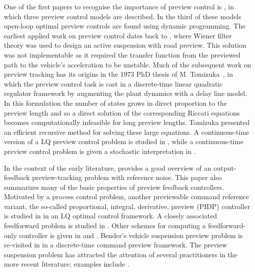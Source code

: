 \documentclass[a4paper,12pt]{article}
\theoremstyle{remark}
\begin{document}
One of the first papers to recognise the importance of preview control is \cite{Sheridan}, in which three preview control models are described. In the third of these models open-loop optimal preview controls are found using dynamic programming. The earliest applied work on preview control dates back to \cite{Bender_1968_PrevSusp}, where Wiener filter theory was used to design an active suspension with road preview. This solution was not implementable as it required the transfer function from the previewed path to the vehicle's acceleration to be unstable. Much of the subsequent work on preview tracking has its origins in the 1973 PhD thesis of M. Tomizuka~\cite{Tomi_1973_Thesis}, in which  the preview control task is cast in a discrete-time linear quadratic regulator framework by augmenting the plant dynamics with a delay line model. In this formulation the number of states grows in direct proportion to the preview length and so a direct solution of the corresponding Riccati equations becomes computationally infeasible for long preview lengths. Tomizuka presented an efficient recursive method for solving these large equations. A continuous-time version of a LQ preview control problem is studied in \cite{Tomizuka_1975_ContinuousLQPreview}, while a continuous-time preview control problem is given a stochastic interpretation in \cite{Lindquist}.

In the context of the early literature, \cite{Tomizuka_1975_OptDiscretePreview} provides a good overview of an output-feedback preview-tracking problem with reference noise. This paper also summarizes many of the basic properties of preview feedback controllers. 
Motivated by a process control problem, another previewable command reference variant, the so-called proportional, integral, derivative, preview (PIDP) controller is studied in \cite{Tomizuka_1979_IntegralPreviewFI} in an LQ optimal control framework. A closely associated feedforward problem is studied in \cite{Tomi_1980_FFPrev}. Other schemes for computing a feedforward-only controller is given in \cite{Zattoni_2006_H2PreviewFF} and \cite{Marro_2005_FFH2Preview}. Bender's vehicle suspension preview problem is re-visited in \cite{Tomi_1976_SuspRevisited} in a discrete-time command preview framework. The preview suspension problem has attracted the attention of several practitioners in the more recent literature; examples include \cite{Hac_1992_Opt_Veh_Susp,Marzbanrad_2004_SuspPrev,Roh_1999_Stoc_Opt_Prev,Sharp_2005_CarHandlingPreview}.
\end{document}
